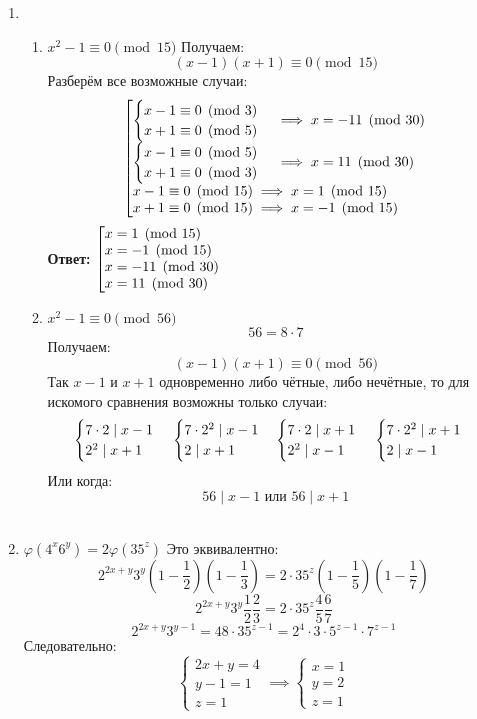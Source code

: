 \documentclass[a4paper]{article}
\makeatletter
\renewcommand{\f}[2]{\frac{#1}{#2}}
\newcommand{\gath}[1]{\left[ \begin{array}{@{}l@{}} #1 \end{array} \right.}
\newcommand{\case}[1]{\begin{cases} #1 \end{cases}}
\newcommand{\divides}{\;|\;}
\makeatother
\begin{document}
\begin{enumerate}
    \item[\textbf{№3}]\begin{enumerate}
        \item[a)]$x^2-1 \equiv 0 \pmod{15}$
        Получаем:
        $$(x-1)(x+1)\equiv 0 \pmod{15}$$
        Разберём все возможные случаи:
        $$\gath{
            \case{
                x-1 \equiv 0 \pmod{3}\\
                x+1 \equiv 0 \pmod{5}\\
            } \implies x = -11 \pmod{30}\\
            \case{
                x-1 \equiv 0 \pmod{5}\\
                x+1 \equiv 0 \pmod{3}\\
            } \implies x = 11 \pmod{30}\\
            x-1 \equiv 0 \pmod{15} \implies x = 1 \pmod{15}\\
            x+1 \equiv 0 \pmod{15} \implies x = -1 \pmod{15}
        }$$
        \textbf{Ответ: }$\gath{
            x = 1 \pmod{15} \\
            x = -1 \pmod{15} \\
            x = -11 \pmod{30}\\
            x = 11 \pmod{30}
         }$ 

        \item[б)]$x^2-1 \equiv 0 \pmod{56}$
        $$56 = 8\cdot 7$$
        Получаем:
        $$(x-1)(x+1)\equiv 0 \pmod{56}$$
        Так $x-1$ и $x+1$ одновременно либо чётные, либо нечётные, то для искомого сравнения возможны только случаи:
        $$
        \case{
            7\cdot 2 \divides x-1\\
            2^2 \divides x+1
        }\\
        \case{
            7\cdot 2^2 \divides x-1\\
            2 \divides x+1
        }
        \case{
            7\cdot 2 \divides x+1\\
            2^2 \divides x-1
        }\\
        \case{
            7\cdot 2^2 \divides x+1\\
            2 \divides x-1
        }
        $$
        Или когда:
        $$56 \divides x-1 \text{ или } 56 \divides x+1$$\\
    \end{enumerate}

    \item[\textbf{№4}]$\varphi(4^x6^y) = 2\varphi(35^z)$
    Это эквивалентно:
    $$2^{2x+y}3^y(1-\f{1}{2})(1-\f{1}{3}) = 2\cdot 35^z (1 - \f{1}{5})(1-\f{1}{7})$$
    $$2^{2x+y}3^y\f{1}{2}\f{2}{3} = 2\cdot 35^z \f{4}{5}\f{6}{7}$$
    $$2^{2x+y}3^{y-1} =  48 \cdot 35^{z-1} = 2^{4}\cdot 3 \cdot 5^{z-1}\cdot 7^{z-1}$$
    Следовательно:
    $$\case{
        2x+y = 4\\
        y-1 = 1\\
        z = 1
    } \implies \case{
        x = 1\\
        y = 2\\
        z = 1
    } $$


\end{enumerate}
\end{document}
